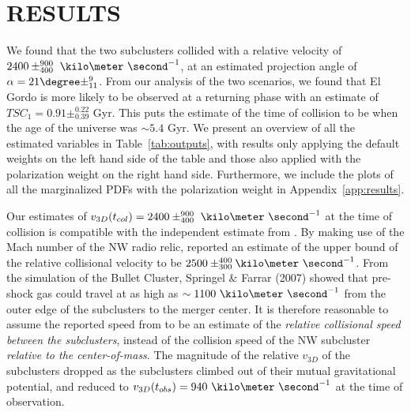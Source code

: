 \section{RESULTS} 
We found that the two subclusters collided with a relative velocity of $2400\pm^{900}_{400}~\kilo\meter~\second^{-1}$, at an estimated projection
angle of $\alpha = 21\degree\pm^{9}_{11}$. From our analysis of the two
scenarios, we found that El Gordo is more likely to be observed at a returning
phase with an estimate of $TSC_1 = 0.91\pm^{0.22}_{0.39}$ Gyr. This puts the
estimate of the time of collision to be when the age of the universe was
$\sim5.4$ Gyr. We present an
overview of all the estimated variables in Table~\ref{tab:outputs}, with
results only applying the default weights on the left hand side of the table
and those also applied with the polarization weight on the right hand side.
Furthermore, we include the plots of all the marginalized PDFs with the
polarization weight in Appendix~\ref{app:results}. \par 
Our estimates of $v_{3D}(t_{col}) = 2400\pm^{900}_{400}~\kilo\meter~\second^{-1}$ 
at the time of collision is compatible with the independent estimate from \citealt{L13}. 
By making use of the Mach number of the NW radio relic, \cite{L13}
reported an estimate of the upper bound of the relative collisional
velocity to be $2500
\pm^{400}_{300}\kilo\meter~\second^{-1}$. 
From the simulation of the Bullet Cluster, Springel \& Farrar (2007) showed
that pre-shock gas could travel at as high as $\sim
1100~\kilo\meter~\second^{-1}$ from the outer edge of the subclusters to
the merger center.  It is therefore reasonable to assume the reported speed
from \cite{L13} to be an estimate of the {\it relative collisional speed
between the subclusters}, instead of the collision speed of the NW
subcluster {\it relative to the center-of-mass}.
The magnitude of the relative $v_{3D}$ of the subclusters dropped as the
subclusters climbed out of their mutual gravitational potential, and
reduced to $v_{3D}(t_{obs}) = 940~\kilo\meter~\second^{-1}$ at
the time of observation.\par 

